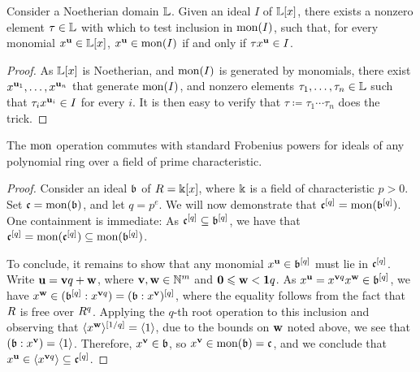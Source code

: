 \documentclass{article}
\begin{document}
\begin{lemma}
\label{single multiplier: L}
Consider a Noetherian domain $\mathbb{L}$.
Given an ideal $I$ of $\mathbb{L}[x]$, there exists a nonzero element $\tau \in \mathbb{L}$ with which to test inclusion in $\operatorname{mon}(I)$, \ie such that, for every monomial $x^{\mathbf{u}} \in \mathbb{L}[x]$,  $x^{\mathbf{u}} \in \operatorname{mon}(I)$ if and only if $\tau x^{\mathbf{u}} \in I$.
\end{lemma}

\begin{proof}  As $\mathbb{L}[x]$ is Noetherian, and $\operatorname{mon}(I)$ is generated by monomials, there exist $x^{\mathbf{u}_1}, \ldots, x^{\mathbf{u}_n}$ that generate $\operatorname{mon}(I)$, and nonzero elements $\tau_1, \ldots, \tau_n \in \mathbb{L}$ such that $\tau_i x^{\mathbf{u}_i} \in I$ for every $i$.  It is then easy to verify that $\tau\coloneqq \tau_1 \cdots \tau_n$ does the trick.
\end{proof}

\begin{lemma} 
\label{frobenius-powers+mon-commute: L}
The $\operatorname{mon}$ operation commutes with standard Frobenius powers for ideals of any polynomial ring over a field of prime characteristic. %
\end{lemma}

\begin{proof}
   Consider an ideal $\mathfrak{b}$ of $R=\Bbbk[x]$, where $\Bbbk$ is a field of characteristic $p>0$.
   Set $\mathfrak{c} = \operatorname{mon}(\mathfrak{b})$, and let $q=p^e$.
   We will now demonstrate that $\mathfrak{c}^{[q]} = \operatorname{mon}(\mathfrak{b}^{[q]})$.
   One containment is immediate:   As $\mathfrak{c}^{[q]} \subseteq \mathfrak{b}^{[q]}$, we have that $\mathfrak{c}^{[q]} = \operatorname{mon}(\mathfrak{c}^{[q]}) \subseteq \operatorname{mon}(\mathfrak{b}^{[q]})$.
   
   To conclude, it remains to show that any monomial $x^{\mathbf{u}} \in \mathfrak{b}^{[q]}$ must lie in $\mathfrak{c}^{[q]}$.
   Write $\mathbf{u} = \mathbf{v}q + \mathbf{w}$, where $\mathbf{v}, \mathbf{w} \in \mathbb{N}^m$ and $\mathbf{0} \leqslant \mathbf{w} < \mathbf{1}q$.
   As $x^{\mathbf{u}} = x^{\mathbf{v}q} x^{\mathbf{w}} \in \mathfrak{b}^{[q]}$, we have $x^{\mathbf{w}} \in ( \mathfrak{b}^{[q]}: x^{\mathbf{v}q}) = (\mathfrak{b}:x^{\mathbf{v}})^{[q]}$, where the equality follows from the fact that $R$ is free over $R^q$.
   Applying the $q$-th root operation to this inclusion and observing that $\langle x^{\mathbf{w}} \rangle^{[1/q]} = \langle 1 \rangle$, due to the bounds on $\mathbf{w}$ noted above, we see that $ (\mathfrak{b}: x^{\mathbf{v}}) = \langle 1 \rangle$.
   Therefore, $x^{\mathbf{v}} \in \mathfrak{b}$, so $x^{\mathbf{v}} \in \operatorname{mon}(\mathfrak{b}) = \mathfrak{c}$, and we conclude that $x^{\mathbf{u}} \in \langle x^{\mathbf{v}q} \rangle \subseteq \mathfrak{c}^{[q]}$.
\end{proof}
\end{document}

